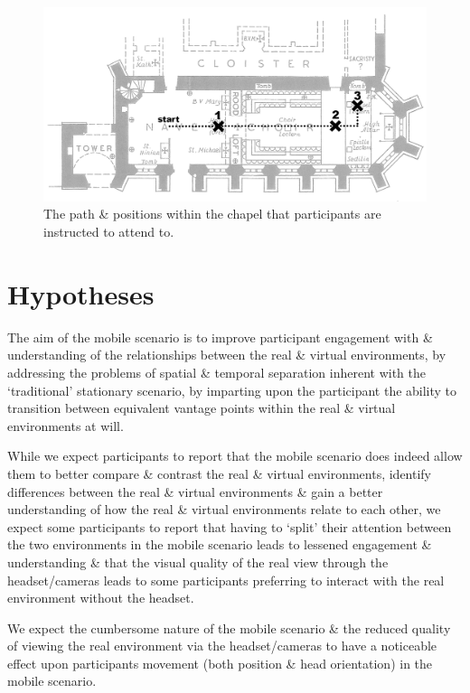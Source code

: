 \begin{figure}[h]
	\begin{center}
		\includegraphics[width=\linewidth]{images/chapel_path.png}
		\caption{The path \& positions within the chapel that participants are instructed to attend to.}
		\label{chapel_path}
	\end{center}
\end{figure}

\section{Hypotheses}
The aim of the mobile scenario is to improve participant engagement with \& understanding of the relationships between the real \& virtual environments, by addressing the problems of spatial \& temporal separation inherent with the `traditional' stationary scenario, by imparting upon the participant the ability to transition between equivalent vantage points within the real \& virtual environments at will.

While we expect participants to report that the mobile scenario does indeed allow them to better compare \& contrast the real \& virtual environments, identify differences between the real \& virtual environments \& gain a better understanding of how the real \& virtual environments relate to each other, we expect some participants to report that having to `split' their attention between the two environments in the mobile scenario leads to lessened engagement \& understanding \& that the visual quality of the real view through the headset/cameras leads to some participants preferring to interact with the real environment without the headset.

We expect the cumbersome nature of the mobile scenario \& the reduced quality of viewing the real environment via the headset/cameras to have a noticeable effect upon participants movement (both position \& head orientation) in the mobile scenario.

